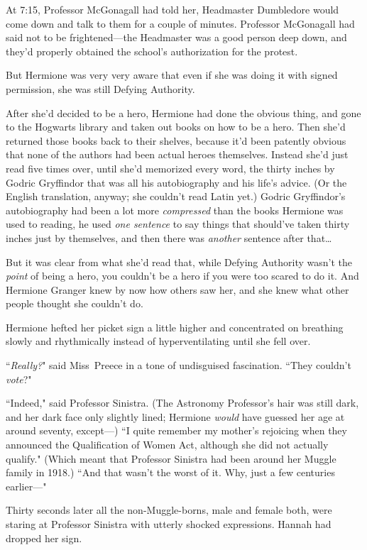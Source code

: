 At 7:15\pm, Professor McGonagall had told her, Headmaster Dumbledore would come down and talk to them for a couple of minutes. Professor McGonagall had said not to be frightened---the Headmaster was a good person deep down, and they'd properly obtained the school's authorization for the protest.

But Hermione was very very aware that even if she was doing it with signed permission, she was still Defying Authority.

After she'd decided to be a hero, Hermione had done the obvious thing, and gone to the Hogwarts library and taken out books on how to be a hero. Then she'd returned those books back to their shelves, because it'd been patently obvious that none of the authors had been actual heroes themselves. Instead she'd just read five times over, until she'd memorized every word, the thirty inches by Godric Gryffindor that was all his autobiography and his life's advice. (Or the English translation, anyway; she couldn't read Latin yet.) Godric Gryffindor's autobiography had been a lot more \emph{compressed} than the books Hermione was used to reading, he used \emph{one sentence} to say things that should've taken thirty inches just by themselves, and then there was \emph{another} sentence after that{\ldots}

But it was clear from what she'd read that, while Defying Authority wasn't the \emph{point} of being a hero, you couldn't be a hero if you were too scared to do it. And Hermione Granger knew by now how others saw her, and she knew what other people thought she couldn't do.

Hermione hefted her picket sign a little higher and concentrated on breathing slowly and rhythmically instead of hyperventilating until she fell over.

``\emph{Really?}" said Miss~Preece in a tone of undisguised fascination. ``They couldn't \emph{vote}?"

``Indeed," said Professor Sinistra. (The Astronomy Professor's hair was still dark, and her dark face only slightly lined; Hermione \emph{would} have guessed her age at around seventy, except---) ``I quite remember my mother's rejoicing when they announced the Qualification of Women Act, although she did not actually qualify." (Which meant that Professor Sinistra had been around her Muggle family in 1918.) ``And that wasn't the worst of it. Why, just a few centuries earlier---"

Thirty seconds later all the non-Muggle-borns, male and female both, were staring at Professor Sinistra with utterly shocked expressions. Hannah had dropped her sign.

